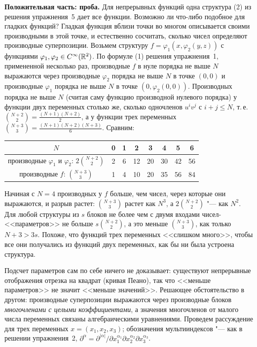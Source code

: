 \begin{solution}[6 (\S\,5)]
\textbf{Положительная часть: проба.} Для непрерывных функций одна
структура (2) из решения упражнения~5 дает все функции. Возможно ли что-либо
подобное для гладких функций? Гладкая функция вблизи точки во многом
описывается своими производными в этой точке, и естественно сосчитать,
сколько чисел определяют производные суперпозиции. Возьмем структуру
$f=\varphi_1(x,\varphi_2(y,z))$ с функциями $\varphi_1,\varphi_2\in C^\infty(\mathbb R^2)$.
По формуле (1) решения упражнения~1, примененной несколько раз, производные
$f$ в нуле порядка не выше $N$ выражаются через производные $\varphi_2$
порядка не выше $N$ в точке $(0,0)$ и производные $\varphi_1$ порядка не
выше $N$ в точке $(0,\varphi_2(0,0))$. Производных порядка не выше $N$
(считая саму функцию производной нулевого порядка) у функции двух
переменных столько же, сколько одночленов $u^iv^j$ с $i+j\le N$, т.\,е.
$\binom{N+2}2=\frac{(N+1)(N+2)}2$, а у функции трех переменных
$\binom{N+3}3=\frac{(N+1)(N+2)(N+3)}6$. Сравним:
\begin{center}
\begin{tabular}{c|ccccccc}
$N$&0&1&2&3&4&5&6\\\hline
производные $\varphi_1$ и $\varphi_2$: $2\binom{N+2}2$&2&6&12&20&30&42&56\\
производные $f$: $\binom{N+3}3$&1&4&10&20&35&56&84
\end{tabular}
\end{center}
Начиная с $N=4$ производных у $f$ больше, чем чисел, через которые они
выражаются, и разрыв растет: $\binom{N+3}3$ растет как $N^3$, а
$2\binom{N+2}2$ "--- как $N^2$. Для любой структуры из $s$ блоков не более
чем с двумя входами чисел-<<параметров>> не больше $s\binom{N+2}2$, а это
меньше $\binom{N+3}3$, как только $N+3>3s$. Похоже, что функций трех
переменных <<слишком много>>, чтобы все они получались из функций двух
переменных, как бы ни была устроена структура.

Подсчет параметров сам по себе ничего не доказывает: существуют
непрерывные отображения отрезка на квадрат (кривая Пеано), так что <<меньше
параметров>> не значит <<меньше значений>>. Решающее обстоятельство в другом:
производные суперпозиции выражаются через производные блоков
\emph{многочленами с целыми коэффициентами}, а значения многочленов от малого
числа переменных связаны алгебраическими уравнениями. Проведем рассуждение
для трех переменных $x=(x_1,x_2,x_3)$; обозначения мультииндексов "--- как
в решении упражнения~2, $\partial^\alpha=\partial^{|\alpha|}/\partial
x_1^{\alpha_1}\partial x_2^{\alpha_2}\partial x_3^{\alpha_3}$.


\end{solution}
